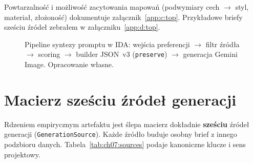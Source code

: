 Powtarzalność i możliwość zacytowania mapowań (podwymiary cech $\rightarrow$ styl, materiał, złożoność) dokumentuje załącznik~\ref{app:c:top}. Przykładowe briefy sześciu źródeł zebrałem w załączniku~\ref{app:d:top}.

\begin{figure}[htbp]
  \centering
  \caption{Pipeline syntezy promptu w IDA: wejścia preferencji $\rightarrow$ filtr źródła $\rightarrow$ scoring $\rightarrow$ builder JSON~v3 (\texttt{preserve}) $\rightarrow$ generacja Gemini Image. Opracowanie własne.}
  \label{fig:ch07:pipeline}
\end{figure}

\section{Macierz sześciu źródeł generacji}
\label{ch07:sec:macierz}

Rdzeniem empirycznym artefaktu jest ślepa macierz dokładnie \textbf{sześciu} źródeł generacji (\texttt{GenerationSource}). Każde źródło buduje osobny brief z innego podzbioru danych. Tabela~\ref{tab:ch07:sources} podaje kanoniczne klucze i sens projektowy.

